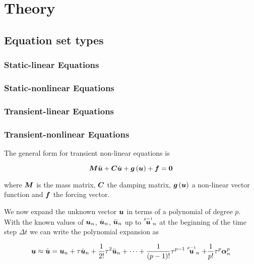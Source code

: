 \chapter{Theory}
\label{cha:theory}

\section{Equation set types}

\subsection{Static-linear Equations}

\subsection{Static-nonlinear Equations}

\subsection{Transient-linear Equations}

\subsection{Transient-nonlinear Equations}

The general form for transient non-linear equations is

\begin{equation}
  \matr{M}\ddot{\vect{u}}+\matr{C}\dot{\vect{u}}+\fnof{\vect{g}}{\vect{u}}+\vect{f}=\vect{0}
  \label{eqn:generaltransientnonlinear}
\end{equation}

where $\matr{M}$ is the mass matrix, $\matr{C}$ the damping matrix,
$\fnof{\vect{g}}{\vect{u}}$ a non-linear vector function and $\vect{f}$ the
forcing vector.

We now expand the unknown vector $\vect{u}$ in terms of a polynomial of degree
$p$. With the known values of $\vect{u}_{n}$, $\dot{\vect{u}}_{n}$,
$\ddot{\vect{u}}_{n}$ up to $\symover{p-1}{\vect{u}}_{n}$ at the beginning of
the time step $\Delta t$ we can write the polynomial expansion as

\begin{equation}
  \vect{u}\approx\hat{\vect{u}}=\vect{u}_{n}+\tau\dot{\vect{u}}_{n}+\frac{1}{2!}\tau^{2}\ddot{\vect{u}}_{n}+\cdots+
  \dfrac{1}{\factorial{p-1}}\tau^{p-1}\symover{p-1}{\vect{u}}_{n}+\dfrac{1}{p!}\tau^{p}\vect{\alpha}^{p}_{n}
  \label{eqn:timepolyexpansion}
\end{equation}

